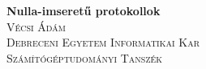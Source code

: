 %
%
%

\begin{titlepage}

\center

{\huge \bfseries {{Nulla-imseretű protokollok}}}\\[1.5cm]

\textsc{\Large {{Vécsi Ádám}}}\\
\textsc{\large {{Debreceni Egyetem Informatikai Kar}}}\\
\textsc{\large {{Számítógéptudományi Tanszék}}}

\vfill

\end{titlepage}
